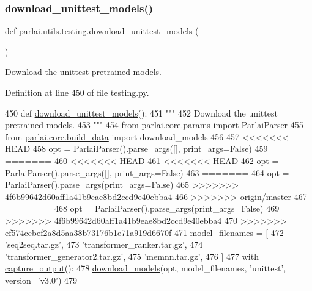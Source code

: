 \subsubsection{\texorpdfstring{download\+\_\+unittest\+\_\+models()}{download\_unittest\_models()}}
{\footnotesize\ttfamily def parlai.\+utils.\+testing.\+download\+\_\+unittest\+\_\+models (\begin{DoxyParamCaption}{ }\end{DoxyParamCaption})}

\begin{DoxyVerb}Download the unittest pretrained models.
\end{DoxyVerb}
 

Definition at line 450 of file testing.\+py.


\begin{DoxyCode}
450 \textcolor{keyword}{def }\hyperlink{namespaceparlai_1_1utils_1_1testing_ae0c93fc8f4c3e079333dba0065fa4dd2}{download\_unittest\_models}():
451     \textcolor{stringliteral}{"""}
452 \textcolor{stringliteral}{    Download the unittest pretrained models.}
453 \textcolor{stringliteral}{    """}
454     \textcolor{keyword}{from} \hyperlink{namespaceparlai_1_1core_1_1params}{parlai.core.params} \textcolor{keyword}{import} ParlaiParser
455     \textcolor{keyword}{from} \hyperlink{namespaceparlai_1_1core_1_1build__data}{parlai.core.build\_data} \textcolor{keyword}{import} download\_models
456 
457 <<<<<<< HEAD
458     opt = ParlaiParser().parse\_args([], print\_args=\textcolor{keyword}{False})
459 =======
460 <<<<<<< HEAD
461 <<<<<<< HEAD
462     opt = ParlaiParser().parse\_args([], print\_args=\textcolor{keyword}{False})
463 =======
464     opt = ParlaiParser().parse\_args(print\_args=\textcolor{keyword}{False})
465 >>>>>>> 4f6b99642d60aff1a41b9eae8bd2ccd9e40ebba4
466 >>>>>>> origin/master
467 =======
468     opt = ParlaiParser().parse\_args(print\_args=\textcolor{keyword}{False})
469 >>>>>>> 4f6b99642d60aff1a41b9eae8bd2ccd9e40ebba4
470 >>>>>>> ef574cebef2a8d5aa38b73176b1e71a919d6670f
471     model\_filenames = [
472         \textcolor{stringliteral}{'seq2seq.tar.gz'},
473         \textcolor{stringliteral}{'transformer\_ranker.tar.gz'},
474         \textcolor{stringliteral}{'transformer\_generator2.tar.gz'},
475         \textcolor{stringliteral}{'memnn.tar.gz'},
476     ]
477     with \hyperlink{namespaceparlai_1_1utils_1_1testing_ab00d4d693202afab92c06387aa50699b}{capture\_output}():
478         \hyperlink{namespaceparlai_1_1core_1_1build__data_ab697f23f05d3e36d7979fe5e0ed7911e}{download\_models}(opt, model\_filenames, \textcolor{stringliteral}{'unittest'}, version=\textcolor{stringliteral}{'v3.0'})
479 \end{DoxyCode}
\mbox{\label{namespaceparlai_1_1utils_1_1testing_ab5bd02c7b5ab42c393ddddf73d9c78d2}} 
